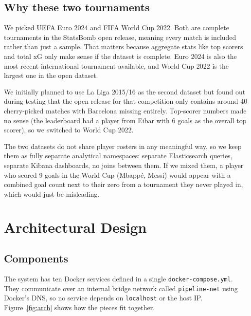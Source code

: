 \documentclass[conference]{IEEEtran}
\begin{document}
\subsection{Why these two tournaments}

We picked UEFA Euro 2024 and FIFA World Cup 2022. Both are complete tournaments
in the StatsBomb open release, meaning every match is included rather than just
a sample. That matters because aggregate stats like top scorers and total xG
only make sense if the dataset is complete. Euro 2024 is also the most recent
international tournament available, and World Cup 2022 is the largest one in
the open dataset.

We initially planned to use La Liga 2015/16 as the second dataset but found out
during testing that the open release for that competition only contains around
40 cherry-picked matches with Barcelona missing entirely. Top-scorer numbers
made no sense (the leaderboard had a player from Eibar with 6 goals as the
overall top scorer), so we switched to World Cup 2022.

The two datasets do not share player rosters in any meaningful way, so we keep
them as fully separate analytical namespaces: separate Elasticsearch queries,
separate Kibana dashboards, no joins between them. If we mixed them, a player
who scored 9 goals in the World Cup (Mbapp\'e, Messi) would appear with a
combined goal count next to their zero from a tournament they never played in,
which would just be misleading.


\section{Architectural Design}

\subsection{Components}

The system has ten Docker services defined in a single
\texttt{docker-compose.yml}. They communicate over an internal bridge network
called \texttt{pipeline-net} using Docker's DNS, so no service depends on
\texttt{localhost} or the host IP. Figure~\ref{fig:arch} shows how the pieces
fit together.
\end{document}
